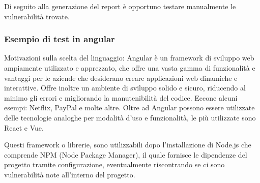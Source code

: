 Di seguito alla generazione del report è opportuno testare manualmente le vulnerabilità trovate. 
\subsubsection{Esempio di test in angular}
Motivazioni sulla scelta del linguaggio: Angular è un framework di sviluppo web ampiamente utilizzato e apprezzato, che offre una vasta gamma di funzionalità e vantaggi per le aziende che desiderano creare applicazioni web dinamiche e interattive. Offre inoltre un ambiente di sviluppo solido e sicuro, riducendo al minimo gli errori e migliorando la manutenibilità del codice.
Eccone alcuni esempi: Netflix, PayPal e molte altre. 
Oltre ad Angular possono essere utilizzate delle tecnologie analoghe per modalità d’uso e funzionalità, le più utilizzate sono React e Vue. 

Questi framework o librerie, sono utilizzabili dopo l’installazione di Node.js che comprende NPM (Node Package Manager), il quale fornisce le dipendenze del progetto tramite configurazione, eventualmente riscontrando se ci sono vulnerabilità note all’interno del progetto. 

